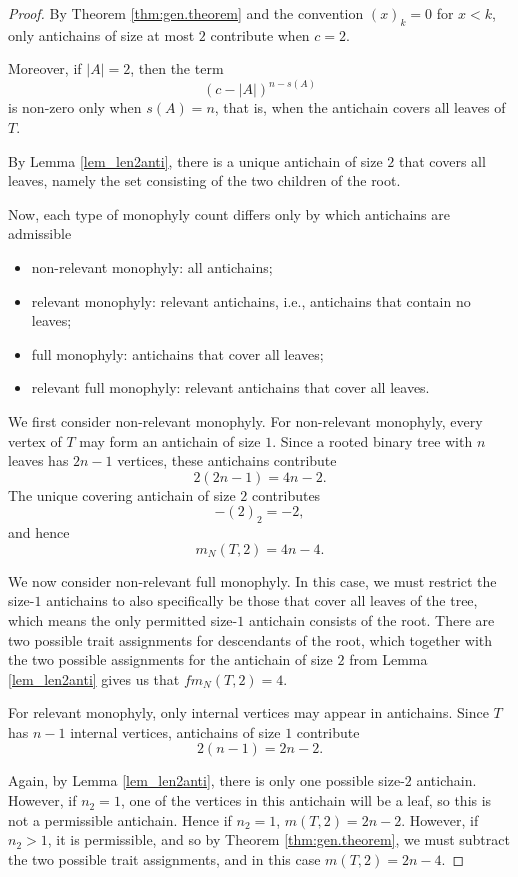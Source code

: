 \documentclass[10pt,a4paper]{amsart}
\begin{document}
\begin{proof}
By Theorem \ref{thm:gen.theorem} and the convention $(x)_k=0$ for $x<k$,
only antichains of size at most $2$ contribute when $c=2$.

Moreover, if $|A|=2$, then the term
\[
(c-|A|)^{n-s(A)}
\]
is non-zero only when $s(A)=n$, that is, when the antichain covers all leaves of $T$.

By Lemma \ref{lem_len2anti}, there is a unique antichain of size $2$ that covers all leaves, namely the set consisting of the two children of the root.

Now, each type of monophyly count differs only by which antichains are admissible

\begin{itemize}
\item non-relevant monophyly: all antichains;
\item relevant monophyly: relevant antichains, i.e., antichains that contain no leaves;
\item full monophyly: antichains that cover all leaves;
\item relevant full monophyly: relevant antichains that cover all leaves.
\end{itemize}

We first consider non-relevant monophyly. For non-relevant monophyly, every vertex of $T$ may form an antichain of size $1$. Since a rooted binary tree with $n$ leaves has $2n-1$ vertices, these antichains contribute
\[
2(2n-1)=4n-2.
\]
The unique covering antichain of size $2$ contributes
\[
-(2)_2= -2,
\]
and hence
\[
m_N(T,2)=4n-4.\]

We now consider non-relevant full monophyly. In this case, we must restrict the size-$1$ antichains to also specifically be those that cover all leaves of the tree, which means the only permitted size-$1$ antichain consists of the root. There are two possible trait assignments for descendants of the root, which together with the two possible assignments for the antichain of size $2$ from Lemma \ref{lem_len2anti} gives us that $fm_N(T,2)=4$.

For relevant monophyly, only internal vertices may appear in antichains. Since $T$ has $n-1$ internal vertices, antichains of size $1$ contribute
\[
2(n-1)=2n-2.
\] 

Again, by Lemma \ref{lem_len2anti}, there is only one possible size-$2$ antichain. However, if $n_2=1$, one of the vertices in this antichain will be a leaf, so this is not a permissible antichain. Hence if $n_2=1$, $m(T,2)=2n-2$. However, if $n_2>1$, it is permissible, and so by Theorem \ref{thm:gen.theorem}, we must subtract the two possible trait assignments, and in this case $m(T,2)=2n-4$.


\end{proof}
\end{document}
